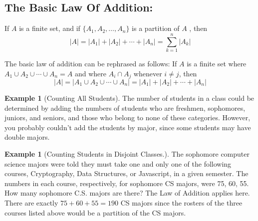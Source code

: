 \documentclass[10pt,]{book}
\theoremstyle{plain}
\theoremstyle{definition}
\newtheorem{example}[theorem]{Example}
\begin{document}
\subsection[The Basic Law Of Addition:]{The Basic Law Of Addition:}\label{basic-law-addition}
If \(A\) is a finite set, and if \(\{A_1,A_2,\ldots ,A_n\}\) is a partition of \(A\) , then 
\[\lvert A \rvert = \lvert A_1 \rvert + \lvert A_2 \rvert + \cdots + \lvert A_n \rvert = \sum _{k=1}^n  \lvert A_k \rvert\]
%
\par

 The basic law of addition can be rephrased as follows: If \(A\)  is a finite set where \(A_1 \cup A_2 \cup \cdots \cup A_n = A\) and where \(A_i \cap A_j\) whenever \(i \neq j\), then
 \[\lvert A \rvert = \lvert A_1 \cup A_2 \cup  \cdots \cup A_n  \rvert = \lvert A_1 \rvert + \lvert A_2 \rvert + \cdots + \lvert A_n \rvert \]
%
\begin{example}[Counting All Students]\label{counting-all-students}
The number of students in a class could be determined by adding the numbers of students who are freshmen, sophomores, juniors, and seniors, and those who belong to none of these categories. However, you probably couldn't add the students by major, since some students may have double majors.
%
\end{example}
\begin{example}[Counting Students in Disjoint Classes.]\label{student-counting-disjoint}
The sophomore computer science majors were told they must take one and only one of the following courses, Cryptography, Data Structures, or Javascript, in a given semester. The numbers in each course, respectively, for sophomore CS majors, were 75, 60, 55. How many sophomore C.S. majors are there? The Law of Addition applies here. There are exactly \(75 + 60 + 55 = 190\) CS majors since the rosters of the three courses listed above would be a partition of the CS majors.%
\end{example}
\end{document}
